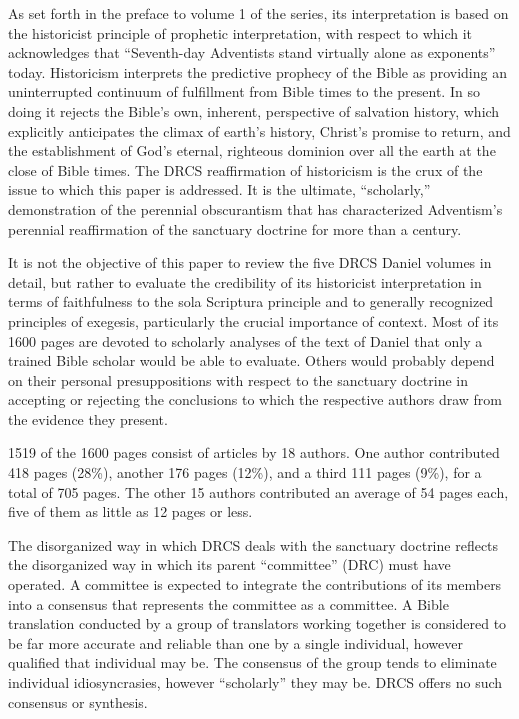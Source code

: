 As set forth in the preface to volume 1 of the series, its interpretation is
based on the historicist principle of prophetic interpretation, with respect
to which it acknowledges that ``Seventh-day Adventists stand virtually alone
as exponents'' today. Historicism interprets the predictive prophecy of the
Bible as providing an uninterrupted continuum of fulfillment from Bible
times to the present. In so doing it rejects the Bible's own, inherent,
perspective of salvation history, which explicitly anticipates the climax of
earth's history, Christ's promise to return, and the establishment of God's
eternal, righteous dominion over all the earth at the close of Bible
times. The DRCS reaffirmation of historicism is the crux of the issue to
which this paper is addressed. It is the ultimate, ``scholarly,''
demonstration of the perennial obscurantism that has characterized
Adventism's perennial reaffirmation of the sanctuary doctrine for more than
a century.

It is not the objective of this paper to review the five DRCS Daniel volumes
in detail, but rather to evaluate the credibility of its historicist
interpretation in terms of faithfulness to the sola Scriptura principle and
to generally recognized principles of exegesis, particularly the crucial
importance of context. Most of its 1600 pages are devoted to scholarly
analyses of the text of Daniel that only a trained Bible scholar would be
able to evaluate. Others would probably depend on their personal
presuppositions with respect to the sanctuary doctrine in accepting or
rejecting the conclusions to which the respective authors draw from the
evidence they present.

1519 of the 1600 pages consist of articles by 18 authors. One author
contributed 418 pages (28\%), another 176 pages (12\%), and a third 111 pages
(9\%), for a total of 705 pages. The other 15 authors contributed an average
of 54 pages each, five of them as little as 12 pages or less.

The disorganized way in which DRCS deals with the sanctuary doctrine
reflects the disorganized way in which its parent ``committee'' (DRC) must
have operated. A committee is expected to integrate the contributions of its
members into a consensus that represents the committee as a committee. A
Bible translation conducted by a group of translators working together is
considered to be far more accurate and reliable than one by a single
individual, however qualified that individual may be. The consensus of the
group tends to eliminate individual idiosyncrasies, however ``scholarly'' they
may be. DRCS offers no such consensus or synthesis.

